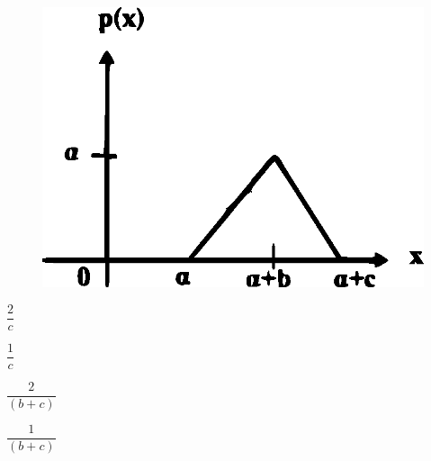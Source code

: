 \documentclass[journal,12pt,twocolumn]{IEEEtran}
\begin{document}
\begin{enumerate}
\begin{figure}[!h]
\includegraphics[width=\columnwidth]{./figs/figure13.eps}
\caption{}
\label{fig:13}
\end{figure}


\begin{enumerate}
\begin{multicols}{2}
\setlength\itemsep{2em}

\item $\dfrac{2}{c}$
\item $\dfrac{1}{c}$
\item $\dfrac{2}{(b+c)}$
\item $\dfrac{1}{(b+c)}$

\end{multicols}
\end{enumerate}


\end{enumerate}
\end{document}
